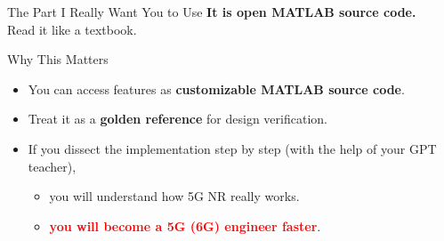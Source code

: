 \begin{frame}{The Part I Really Want You to Use}
\Large  
\centering
\textbf{It is open MATLAB source code.}\\
\vspace{0.8em}
\Large
Read it like a textbook.
\end{frame}

\begin{frame}{Why This Matters}

\begin{itemize}
  \item You can access features as \textbf{customizable MATLAB source code}.
  \item Treat it as a \textbf{golden reference} for design verification.
  \item If you dissect the implementation step by step (with the help of your GPT teacher),
  \begin{itemize}
    \item you will understand how 5G NR really works.
    \item \textcolor{red}{\textbf{you will become a 5G (6G) engineer faster}}.
  \end{itemize}

\end{itemize}

\end{frame}


